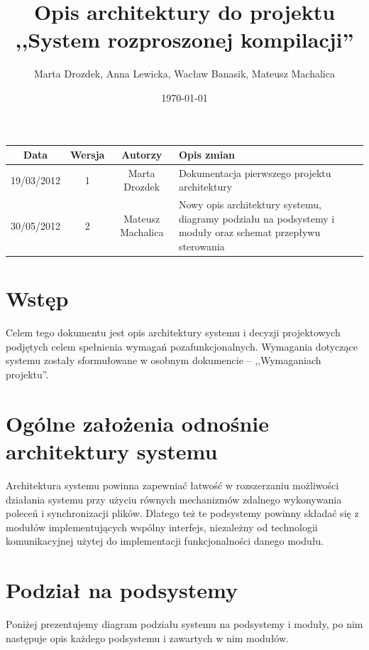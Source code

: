 \documentclass[a4paper]{article}
\title{Opis architektury do projektu ,,System rozproszonej kompilacji''}
\author{Marta Drozdek, Anna Lewicka, Wacław Banasik, Mateusz Machalica}
\date{\today}
\begin{document}
\maketitle

\begin{table}[!h]
	\centering
	\begin{tabular}{|c|c|c|p{8cm}|}
		\hline
		\textbf{Data} & \textbf{Wersja} & \textbf{Autorzy} & \textbf{Opis zmian} \\ \hline
		19/03/2012 & 1 & Marta Drozdek & Dokumentacja pierwszego projektu architektury \\ \hline
		30/05/2012 & 2 & Mateusz Machalica & Nowy opis architektury systemu, diagramy podziału na podsystemy i moduły oraz schemat przepływu sterowania \\ \hline
	\end{tabular}
\end{table}

\section{Wstęp}

Celem tego dokumentu jest opis architektury systemu i decyzji projektowych podjętych celem spełnienia wymagań pozafunkcjonalnych.
Wymagania dotyczące systemu zostały sformułowane w osobnym dokumencie -- ,,Wymaganiach projektu''.



\section{Ogólne założenia odnośnie architektury systemu}

Architektura systemu powinna zapewniać łatwość w rozszerzaniu możliwości działania systemu przy użyciu równych mechanizmów zdalnego wykonywania poleceń i synchronizacji plików.
Dlatego też te podsystemy powinny składać się z modułów implementujących wspólny interfejs, niezależny od technologii komunikacyjnej użytej do implementacji funkcjonalności danego modułu.

\section{Podział na podsystemy}

Poniżej prezentujemy diagram podziału systemu na podsystemy i moduły, po nim następuje opis każdego podsystemu i zawartych w nim modułów.
\end{document}
